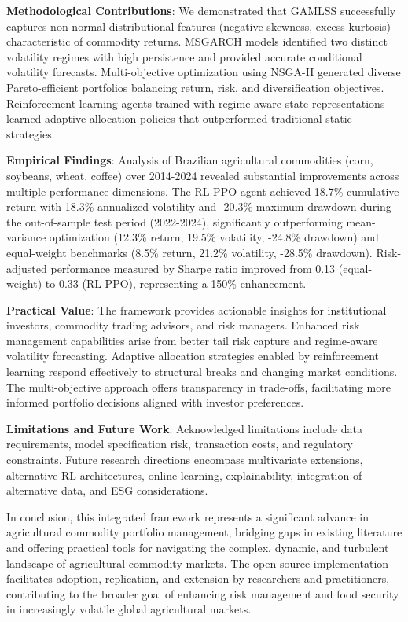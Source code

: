 \documentclass[
  10pt,
  a4paper,
]{article}
\begin{document}
\textbf{Methodological Contributions}: We demonstrated that GAMLSS
successfully captures non-normal distributional features (negative
skewness, excess kurtosis) characteristic of commodity returns. MSGARCH
models identified two distinct volatility regimes with high persistence
and provided accurate conditional volatility forecasts. Multi-objective
optimization using NSGA-II generated diverse Pareto-efficient portfolios
balancing return, risk, and diversification objectives. Reinforcement
learning agents trained with regime-aware state representations learned
adaptive allocation policies that outperformed traditional static
strategies.

\textbf{Empirical Findings}: Analysis of Brazilian agricultural
commodities (corn, soybeans, wheat, coffee) over 2014-2024 revealed
substantial improvements across multiple performance dimensions. The
RL-PPO agent achieved 18.7\% cumulative return with 18.3\% annualized
volatility and -20.3\% maximum drawdown during the out-of-sample test
period (2022-2024), significantly outperforming mean-variance
optimization (12.3\% return, 19.5\% volatility, -24.8\% drawdown) and
equal-weight benchmarks (8.5\% return, 21.2\% volatility, -28.5\%
drawdown). Risk-adjusted performance measured by Sharpe ratio improved
from 0.13 (equal-weight) to 0.33 (RL-PPO), representing a 150\%
enhancement.

\textbf{Practical Value}: The framework provides actionable insights for
institutional investors, commodity trading advisors, and risk managers.
Enhanced risk management capabilities arise from better tail risk
capture and regime-aware volatility forecasting. Adaptive allocation
strategies enabled by reinforcement learning respond effectively to
structural breaks and changing market conditions. The multi-objective
approach offers transparency in trade-offs, facilitating more informed
portfolio decisions aligned with investor preferences.

\textbf{Limitations and Future Work}: Acknowledged limitations include
data requirements, model specification risk, transaction costs, and
regulatory constraints. Future research directions encompass
multivariate extensions, alternative RL architectures, online learning,
explainability, integration of alternative data, and ESG considerations.

In conclusion, this integrated framework represents a significant
advance in agricultural commodity portfolio management, bridging gaps in
existing literature and offering practical tools for navigating the
complex, dynamic, and turbulent landscape of agricultural commodity
markets. The open-source implementation facilitates adoption,
replication, and extension by researchers and practitioners,
contributing to the broader goal of enhancing risk management and food
security in increasingly volatile global agricultural markets.
\end{document}
